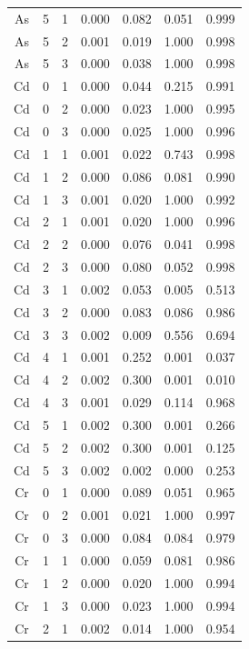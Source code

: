 \documentclass[ms, hidelinks]{uncgdissertationexp3}
\theoremstyle{plain}
\theoremstyle{definition}
\theoremstyle{remark}
\begin{document}
\begin{longtable}{ccccccc}
  As & 5 & 1 & 0.000 & 0.082 & 0.051 & 0.999\\
  \rowcolor{gray!6}  As & 5 & 2 & 0.001 & 0.019 & 1.000 & 0.998\\
  As & 5 & 3 & 0.000 & 0.038 & 1.000 & 0.998\\
  \rowcolor{gray!6}  Cd & 0 & 1 & 0.000 & 0.044 & 0.215 & 0.991\\
  Cd & 0 & 2 & 0.000 & 0.023 & 1.000 & 0.995\\
  \rowcolor{gray!6}  Cd & 0 & 3 & 0.000 & 0.025 & 1.000 & 0.996\\
  Cd & 1 & 1 & 0.001 & 0.022 & 0.743 & 0.998\\
  \rowcolor{gray!6}  Cd & 1 & 2 & 0.000 & 0.086 & 0.081 & 0.990\\
  Cd & 1 & 3 & 0.001 & 0.020 & 1.000 & 0.992\\
  \rowcolor{gray!6}  Cd & 2 & 1 & 0.001 & 0.020 & 1.000 & 0.996\\
  Cd & 2 & 2 & 0.000 & 0.076 & 0.041 & 0.998\\
  \rowcolor{gray!6}  Cd & 2 & 3 & 0.000 & 0.080 & 0.052 & 0.998\\
  Cd & 3 & 1 & 0.002 & 0.053 & 0.005 & 0.513\\
  \rowcolor{gray!6}  Cd & 3 & 2 & 0.000 & 0.083 & 0.086 & 0.986\\
  Cd & 3 & 3 & 0.002 & 0.009 & 0.556 & 0.694\\
  \rowcolor{gray!6}  Cd & 4 & 1 & 0.001 & 0.252 & 0.001 & 0.037\\
  Cd & 4 & 2 & 0.002 & 0.300 & 0.001 & 0.010\\
  \rowcolor{gray!6}  Cd & 4 & 3 & 0.001 & 0.029 & 0.114 & 0.968\\
  Cd & 5 & 1 & 0.002 & 0.300 & 0.001 & 0.266\\
  \rowcolor{gray!6}  Cd & 5 & 2 & 0.002 & 0.300 & 0.001 & 0.125\\
  Cd & 5 & 3 & 0.002 & 0.002 & 0.000 & 0.253\\
  \rowcolor{gray!6}  Cr & 0 & 1 & 0.000 & 0.089 & 0.051 & 0.965\\
  Cr & 0 & 2 & 0.001 & 0.021 & 1.000 & 0.997\\
  \rowcolor{gray!6}  Cr & 0 & 3 & 0.000 & 0.084 & 0.084 & 0.979\\
  Cr & 1 & 1 & 0.000 & 0.059 & 0.081 & 0.986\\
  \rowcolor{gray!6}  Cr & 1 & 2 & 0.000 & 0.020 & 1.000 & 0.994\\
  Cr & 1 & 3 & 0.000 & 0.023 & 1.000 & 0.994\\
  \rowcolor{gray!6}  Cr & 2 & 1 & 0.002 & 0.014 & 1.000 & 0.954\\

\end{longtable}
\end{document}
